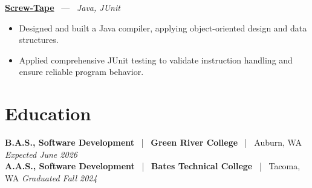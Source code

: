 \documentclass[10pt, letterpaper]{article}
\newcommand{\jobhead}[4]{%
  \vspace{5pt}%
  {\bfseries\color{dark}#1}%
  ~{\color{light}|}~%
  {\bfseries\color{navy}#2}%
  ~{\color{light}|}~%
  {\color{light}#3}%
  \hfill{\color{light}\small\textit{#4}}\\[-2pt]%
}
\newcommand{\projhead}[3]{%
  \vspace{5pt}%
  {\bfseries\color{dark}\href{#2}{#1}}%
  ~{\color{light}---}~%
  {\color{light}\small\textit{#3}}\\[-2pt]%
}
\begin{document}
\projhead{Screw-Tape}{https://github.com/timmyd4/screwtape}{Java, JUnit}
\begin{itemize}
  \item Designed and built a Java compiler, applying object-oriented design and data structures.
  \item Applied comprehensive JUnit testing to validate instruction handling and ensure reliable program behavior.
\end{itemize}

\section{Education}

\jobhead{B.A.S., Software Development}{Green River College}{Auburn, WA}{Expected June 2026}
\jobhead{A.A.S., Software Development}{Bates Technical College}{Tacoma, WA}{Graduated Fall 2024}
\end{document}
